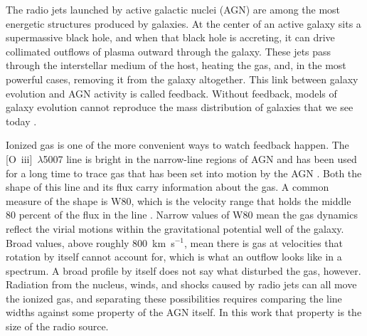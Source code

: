 \documentclass[linenumbers,trackchanges]{aastex701}
\begin{document}
The radio jets launched by active galactic nuclei (AGN) are among the most energetic structures produced by galaxies. At the center of an active galaxy sits a supermassive black hole, and when that black hole is accreting, it can drive collimated outflows of plasma outward through the galaxy. These jets pass through the interstellar medium of the host, heating the gas, and, in the most powerful cases, removing it from the galaxy altogether. This link between galaxy evolution and AGN activity is called feedback. Without feedback, models of galaxy evolution cannot reproduce the mass distribution of galaxies that we see today
\citep{croton06,heckman2014}.

Ionized gas is one of the more convenient ways to watch feedback happen. The [O~{\sc iii}]~$\lambda$5007 line is bright in the narrow-line regions of AGN and has been used for a long time to trace gas that has been set into motion by the AGN \citep[e.g.][]{whittle1985}. Both the shape of this line and its flux carry information about the gas. A common measure of the shape is W80, which is the velocity range that holds the middle 80 percent of the flux in the line \citep[e.g.][]{liu2013}. Narrow values of W80 mean the gas dynamics reflect the virial motions within the gravitational potential well of the galaxy. Broad values, above roughly 800~km~s$^{-1}$, mean there is gas at velocities that rotation by itself cannot account for, which is what an outflow looks like in a spectrum. A broad profile by itself does not say what disturbed the gas, however. Radiation from the nucleus, winds, and shocks caused by radio jets can all move the ionized gas, and separating these possibilities requires comparing the line widths against some property of the AGN itself. In this work that property is the size of the radio source.
\end{document}
